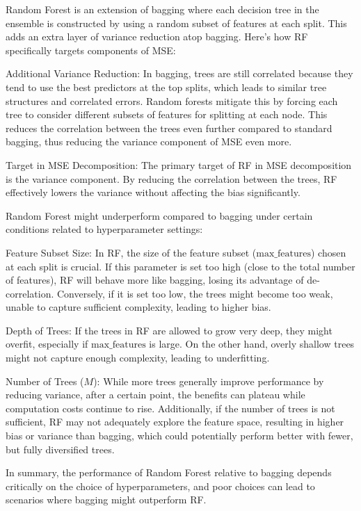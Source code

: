\documentclass[12pt]{article}
\begin{document}
\begin{enumerate}

Random Forest is an extension of bagging where each decision tree in the ensemble is constructed by using a random subset of features at each split. This adds an extra layer of variance reduction atop bagging. Here's how RF specifically targets components of MSE:

Additional Variance Reduction: In bagging, trees are still correlated because they tend to use the best predictors at the top splits, which leads to similar tree structures and correlated errors. Random forests mitigate this by forcing each tree to consider different subsets of features for splitting at each node. This reduces the correlation between the trees even further compared to standard bagging, thus reducing the variance component of MSE even more.

Target in MSE Decomposition: The primary target of RF in MSE decomposition is the variance component. By reducing the correlation between the trees, RF effectively lowers the variance without affecting the bias significantly.



Random Forest might underperform compared to bagging under certain conditions related to hyperparameter settings:

Feature Subset Size: In RF, the size of the feature subset (\(\text{max\_features}\)) chosen at each split is crucial. If this parameter is set too high (close to the total number of features), RF will behave more like bagging, losing its advantage of de-correlation. Conversely, if it is set too low, the trees might become too weak, unable to capture sufficient complexity, leading to higher bias.

Depth of Trees: If the trees in RF are allowed to grow very deep, they might overfit, especially if \(\text{max\_features}\) is large. On the other hand, overly shallow trees might not capture enough complexity, leading to underfitting.

Number of Trees (\(M\)): While more trees generally improve performance by reducing variance, after a certain point, the benefits can plateau while computation costs continue to rise. Additionally, if the number of trees is not sufficient, RF may not adequately explore the feature space, resulting in higher bias or variance than bagging, which could potentially perform better with fewer, but fully diversified trees.

In summary, the performance of Random Forest relative to bagging depends critically on the choice of hyperparameters, and poor choices can lead to scenarios where bagging might outperform RF.


\end{enumerate}
\end{document}
